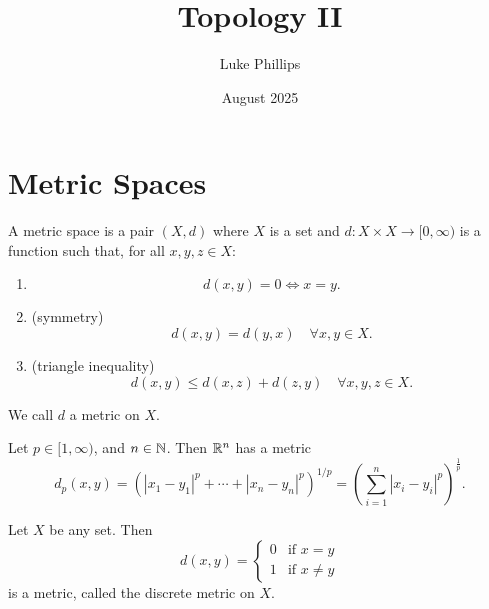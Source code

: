 \documentclass[10pt, a4paper]{article}
\title{Topology II}
\author{Luke Phillips}
\date{August 2025}
\begin{document}
\maketitle

\newpage

\tableofcontents

\newpage

\section{Metric Spaces}

\begin{definition}
    A metric space is a pair $(X, d)$ where $X$ is a set and $d : X \times X \to [0, \infty)$ is a function such that,
    for all $x, y, z \in X$:

    \begin{enumerate}[label = (\alph*)]
        \item
        \[
        d(x, y) = 0 \iff x = y.
        \]

        \item
        (symmetry)
        \[
        d(x, y) = d(y, x)\quad\forall x, y \in X.
        \]

        \item
        (triangle inequality)
        \[
        d(x, y) \leq d(x, z) + d(z, y)\quad\forall x, y, z \in X.
        \]
    \end{enumerate}
\end{definition}

We call $d$ a metric on $X$.

\begin{example}
    Let $p \in [1, \infty)$,
    and $n \in \mathbb{N}$.
    Then $\mathbb{R} ^ n$ has a metric
    \[
    d_p(x, y) = (|x_1 - y_1| ^ p + \dotsi + |x_n - y_n| ^ p) ^ {1 / p} = \left(\sum_{i = 1}^{n}|x_i - y_i| ^ p\right) ^ {\frac{1}{p}}.
    \]
\end{example}

\begin{example}
    Let $X$ be any set.
    Then
    \[
    d(x, y) = \begin{cases}
        0 &\text{if } x = y \\
        1 &\text{if } x \neq y
    \end{cases}
    \]
    is a metric,
    called the discrete metric on $X$.
\end{example}
\end{document}

